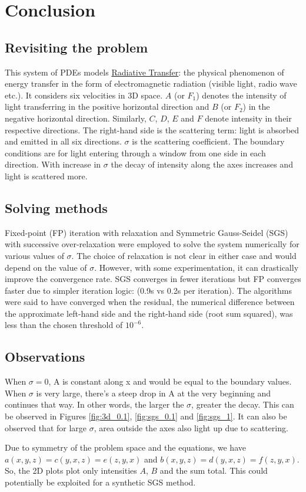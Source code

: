 \documentclass[11pt,titlepage]{article}
\begin{document}
\section{Conclusion}
\subsection{Revisiting the problem}
This system of PDEs models \href{https://en.wikipedia.org/wiki/Radiative_transfer}{Radiative Transfer}: the physical
phenomenon of energy transfer in the form of electromagnetic radiation (visible light, radio wave etc.). It considers six
velocities in 3D space. $A$ (or $F_1$) denotes the intensity of light transferring in the positive horizontal direction
and $B$ (or $F_2$) in the negative horizontal direction. Similarly, $C$, $D$, $E$ and $F$ denote intensity in their
respective directions. The right-hand side is the scattering term: light is absorbed and emitted in all six directions.
$\sigma$ is the scattering coefficient. The boundary conditions are for light entering through a window from one side in
each direction. With increase in $\sigma$ the decay of intensity along the axes increases and light is scattered more.

\subsection{Solving methods}
Fixed-point (FP) iteration with relaxation and Symmetric Gauss-Seidel (SGS) with successive over-relaxation were employed
to solve the system numerically for various values of $\sigma$. The choice of relaxation is not clear in either case and
would depend on the value of $\sigma$. However, with some experimentation, it can drastically improve the convergence
rate. SGS converges in fewer iterations but FP converges faster due to simpler iteration logic: (0.9s vs 0.2s per
iteration). The algorithms were said to have converged when the residual, the numerical difference between the
approximate left-hand side and the right-hand side (root sum squared), was less than the chosen threshold of $10^{-6}$.

\subsection{Observations}
When $\sigma = 0$, A is constant along x and would be equal to the boundary values. When $\sigma$ is very
large, there's a steep drop in A at the very beginning and continues that way. In other words, the larger the $\sigma$,
greater the decay. This can be observed in Figures \ref{fig:3d_0.1}, \ref{fig:sgs_0.1} and \ref{fig:sgs_1}. It can
also be observed that for large $\sigma$, area outside the axes also light up due to scattering.

Due to symmetry of the problem space and the equations, we have $a(x, y, z) = c(y, x, z) = e(z, y, x)$ and $b(x, y, z) =
d(y, x, z) = f(z, y, x)$. So, the 2D plots plot only intensities $A$, $B$ and the sum total. This could potentially
be exploited for a synthetic SGS method.
\end{document}
